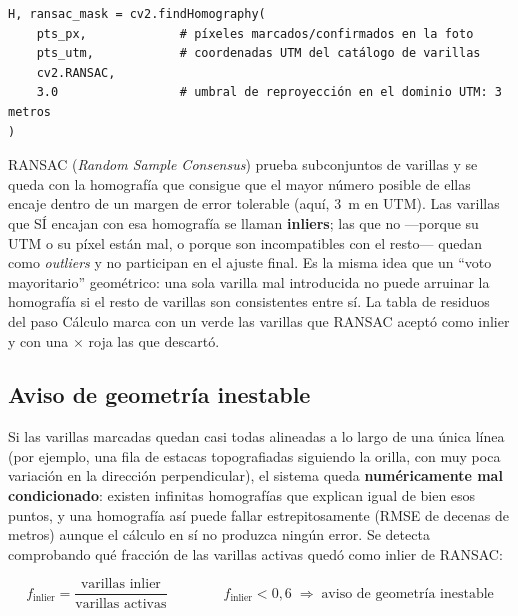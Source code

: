 \begin{codebox}
\begin{verbatim}
H, ransac_mask = cv2.findHomography(
    pts_px,             # píxeles marcados/confirmados en la foto
    pts_utm,            # coordenadas UTM del catálogo de varillas
    cv2.RANSAC,
    3.0                 # umbral de reproyección en el dominio UTM: 3 metros
)
\end{verbatim}
\end{codebox}

\begin{infobox}
RANSAC (\emph{Random Sample Consensus}) prueba subconjuntos de varillas y se queda con la
homografía que consigue que el mayor número posible de ellas encaje dentro de un margen de
error tolerable (aquí, 3~m en UTM). Las varillas que SÍ encajan con esa homografía se llaman
\textbf{inliers}; las que no —porque su UTM o su píxel están mal, o porque son incompatibles
con el resto— quedan como \emph{outliers} y no participan en el ajuste final. Es la misma idea
que un ``voto mayoritario'' geométrico: una sola varilla mal introducida no puede arruinar la
homografía si el resto de varillas son consistentes entre sí. La tabla de residuos del paso
Cálculo marca con un \checkmark verde las varillas que RANSAC aceptó como inlier y con una
\textcolor{BrickRed}{$\times$} roja las que descartó.
\end{infobox}

\subsection{Aviso de geometría inestable}
\label{sec:geometria-inestable}

Si las varillas marcadas quedan casi todas alineadas a lo largo de una única línea (por
ejemplo, una fila de estacas topografiadas siguiendo la orilla, con muy poca variación en la
dirección perpendicular), el sistema queda \textbf{numéricamente mal condicionado}: existen
infinitas homografías que explican igual de bien esos puntos, y una homografía así puede
fallar estrepitosamente (RMSE de decenas de metros) aunque el cálculo en sí no produzca ningún
error. Se detecta comprobando qué fracción de las varillas activas quedó como inlier de
RANSAC:

\begin{equation}
  f_\text{inlier} = \frac{\text{varillas inlier}}{\text{varillas activas}}
  \qquad\qquad
  f_\text{inlier} < 0{,}6 \;\Rightarrow\; \text{aviso de geometría inestable}
\end{equation}

